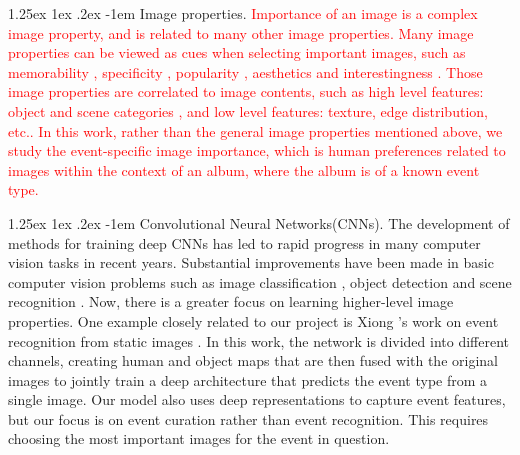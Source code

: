 \documentclass[10pt,twocolumn,letterpaper]{article}
\makeatletter
\renewcommand\paragraph{\@startsection{paragraph}{4}{\z@}%
           {1.25ex \@plus1ex \@minus.2ex}%
           {-1em}%
           {\normalfont\normalsize\bfseries}}
\makeatother
\begin{document}
\paragraph{Image properties.}
\textcolor{red}{Importance of an image is a complex image property, and is related to many other image properties. Many image properties can be viewed as cues when selecting important images, such as memorability \cite{Isola2011, NIPS2011_4451}, specificity \cite{specificity}, popularity \cite{www14_khosla}, aesthetics and interestingness \cite{interesting, interesting2}. Those image properties are correlated to image contents, such as high level features: object and scene categories \cite{Isola2011, NIPS2011_4451, specificity, www14_khosla, interesting}, and low level features: texture, edge distribution, etc.\cite{interesting2, www14_khosla}. In this work, rather than the general image properties mentioned above, we study the event-specific image importance, which is human preferences related to images within the context of an album, where the album is of a known event type.}

\paragraph{Convolutional Neural Networks(CNNs).}
The development of methods for training deep CNNs has led to rapid progress in many computer vision tasks in recent years.  Substantial improvements have been made in basic computer vision problems such as image classification \cite{imagenet, googlenet}, object detection \cite{rcnn, devil} and scene recognition \cite{places, scene}. Now, there is a greater focus on learning higher-level image properties. One example closely related to our project is Xiong \etal's work on event recognition from static images \cite{event_recognition}. In this work, the network is divided into different channels, creating human and object maps that are then fused with the original images to jointly train a deep architecture that predicts the event type from a single image. Our model also uses deep representations to capture event features, but our  focus is on event curation rather than event recognition. This requires choosing the most important images for the event in question.
\end{document}

